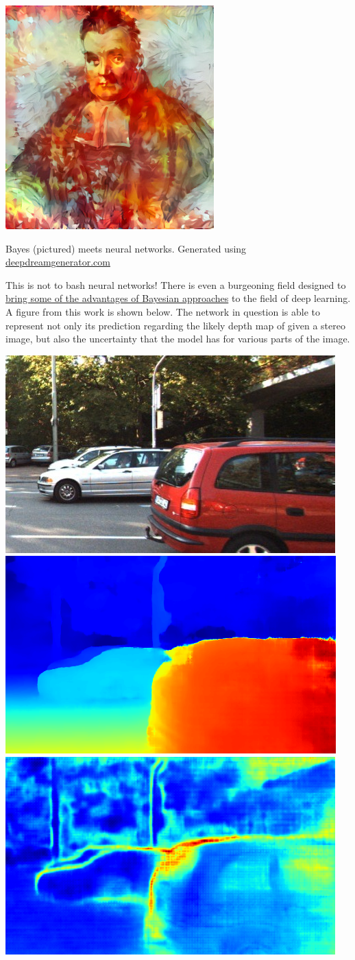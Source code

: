 \documentclass[assignment01_Solutions]{subfiles}
\begin{document}
 \begin{marginfigure}
 \includegraphics[width=\linewidth]{figures/bayesdeepdream}
 \caption{Bayes (pictured) meets neural networks.  Generated using \href{https://deepdreamgenerator.com}{deepdreamgenerator.com}}
 \end{marginfigure}
 This is not to bash neural networks!  There is even a burgeoning field designed to \href{https://alexgkendall.com/computer_vision/bayesian_deep_learning_for_safe_ai/}{bring some of the advantages of Bayesian approaches} to the field of deep learning.  A figure from this work is shown below.  The network in question is able to represent not only its prediction regarding the likely depth map of given a stereo image, but also the uncertainty that the model has for various parts of the image.
 
 \begin{center}
  \includegraphics[width=0.3\linewidth]{figures/left_stereo}
    \includegraphics[width=0.3\linewidth]{figures/disparity}
 \includegraphics[width=0.3\linewidth]{figures/depthuncertainty}
 \end{center}
\end{document}
